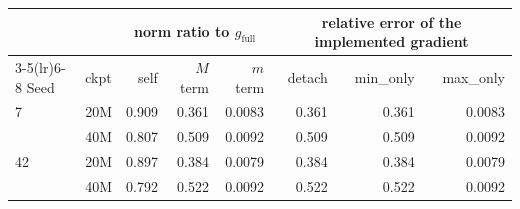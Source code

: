 \begin{tabular}{llrrrrrr}
\toprule
 & & \multicolumn{3}{c}{norm ratio to $g_{\mathrm{full}}$} & \multicolumn{3}{c}{relative error of the implemented gradient} \\
\cmidrule(lr){3-5}\cmidrule(lr){6-8}
Seed & ckpt & self & $M$ term & $m$ term & detach & min\_only & max\_only \\
\midrule
7 & 20M & 0.909 & 0.361 & 0.0083 & 0.361 & 0.361 & 0.0083 \\
 & 40M & 0.807 & 0.509 & 0.0092 & 0.509 & 0.509 & 0.0092 \\
42 & 20M & 0.897 & 0.384 & 0.0079 & 0.384 & 0.384 & 0.0079 \\
 & 40M & 0.792 & 0.522 & 0.0092 & 0.522 & 0.522 & 0.0092 \\
\bottomrule
\end{tabular}
